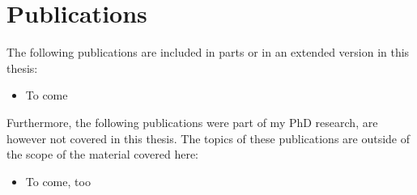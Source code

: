 \chapter*{Publications}

The following publications are included in parts or in an extended version in
this thesis:
\begin{itemize}
\item To come
\end{itemize}

Furthermore, the following publications were part of my PhD research, are
however not covered in this thesis. The topics of these publications are
outside of the scope of the material covered here:
\begin{itemize}
\item To come, too
\end{itemize}
